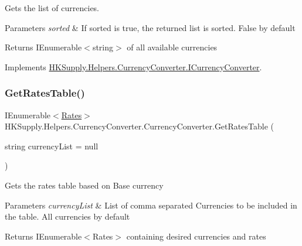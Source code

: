 Gets the list of currencies. 


\begin{DoxyParams}{Parameters}
{\em sorted} & If sorted is true, the returned list is sorted. False by default\\
\hline
\end{DoxyParams}
\begin{DoxyReturn}{Returns}
I\+Enumerable$<$string$>$ of all available currencies 
\end{DoxyReturn}


Implements \mbox{\hyperlink{interface_h_k_supply_1_1_helpers_1_1_currency_converter_1_1_i_currency_converter_af9f4bce7c890c7d5fb61575a641cd5ec}{H\+K\+Supply.\+Helpers.\+Currency\+Converter.\+I\+Currency\+Converter}}.

\mbox{\label{class_h_k_supply_1_1_helpers_1_1_currency_converter_1_1_currency_converter_a9b5ebe58cdabdaec1f1053574a7d792a}} 
\subsubsection{\texorpdfstring{Get\+Rates\+Table()}{GetRatesTable()}}
{\footnotesize\ttfamily I\+Enumerable$<$\mbox{\hyperlink{struct_h_k_supply_1_1_helpers_1_1_currency_converter_1_1_rates}{Rates}}$>$ H\+K\+Supply.\+Helpers.\+Currency\+Converter.\+Currency\+Converter.\+Get\+Rates\+Table (\begin{DoxyParamCaption}\item[{string}]{currency\+List = {\ttfamily null} }\end{DoxyParamCaption})}



Gets the rates table based on Base currency 


\begin{DoxyParams}{Parameters}
{\em currency\+List} & List of comma separated Currencies to be included in the table. All currencies by default\\
\hline
\end{DoxyParams}
\begin{DoxyReturn}{Returns}
I\+Enumerable$<$\+Rates$>$ containing desired currencies and rates
\end{DoxyReturn}



